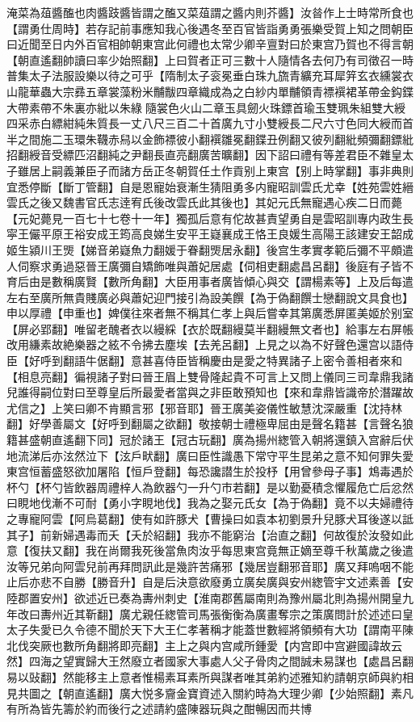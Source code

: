 淹菜為葅醬醢也肉醬跂醬皆謂之醢又菜葅謂之醬内則芥醬】汝㫺作上士時常所食也【謂勇仕周時】若存記前事應知我心後遇冬至百官皆詣勇勇張樂受賀上知之問朝臣曰近聞至日内外百官相帥朝東宫此何禮也太常少卿辛亶對曰於東宫乃賀也不得言朝【朝直遙翻帥讀曰率少始照翻】上曰賀者正可三數十人隨情各去何乃有司徵召一時普集太子法服設樂以待之可乎【隋制太子衮冕垂白珠九旒青纊充耳犀笄玄衣纁裳衣山龍華蟲大宗彞五章裳藻粉米黼黻四章織成為之白紗内單黼領青褾襈裙革帶金鈎鍱大帶素帶不朱裏亦紕以朱綠隨裳色火山二章玉具劒火珠鏢首瑜玉雙珮朱組雙大綬四采赤白縹紺純朱質長一丈八尺三百二十首廣九寸小雙綬長二尺六寸色同大綬而首半之間施二玉環朱韈赤舄以金飾褾彼小翻襈雛冕翻鍱丑例翻又彼列翻紕頻彌翻鏢紕招翻綬音受縹匹沼翻純之尹翻長直亮翻廣苦曠翻】因下詔曰禮有等差君臣不雜皇太子雖居上嗣義兼臣子而諸方岳正冬朝賀任土作貢别上東宫【别上時掌翻】事非典則宜悉停斷【斷丁管翻】自是恩寵始衰漸生猜阻勇多内寵昭訓雲氏尤幸【姓苑雲姓縉雲氏之後又魏書官氏志逹宥氏後改雲氏此其後也】其妃元氏無寵遇心疾二日而薨【元妃薨見一百七十七卷十一年】獨孤后意有佗故甚責望勇自是雲昭訓專内政生長寜王儼平原王裕安成王筠高良娣生安平王嶷襄成王恪王良媛生高陽王該建安王韶成姬生潁川王煚【娣音弟嶷魚力翻媛于眷翻煚居永翻】後宫生孝實孝範后彌不平頗遣人伺察求勇過惡晉王廣彌自矯飾唯與蕭妃居處【伺相吏翻處昌呂翻】後庭有子皆不育后由是數稱廣賢【數所角翻】大臣用事者廣皆傾心與交【謂楊素等】上及后每遣左右至廣所無貴賤廣必與蕭妃迎門接引為設美饌【為于偽翻饌士戀翻說文具食也】申以厚禮【申重也】婢僕往來者無不稱其仁孝上與后嘗幸其第廣悉屏匿美姬於别室【屏必郢翻】唯留老醜者衣以縵綵【衣於既翻縵莫半翻縵無文者也】給事左右屏帳改用縑素故絶樂器之絃不令拂去塵埃【去羌呂翻】上見之以為不好聲色還宫以語侍臣【好呼到翻語牛倨翻】意甚喜侍臣皆稱慶由是愛之特異諸子上密令善相者來和【相息亮翻】徧視諸子對曰晉王眉上雙骨隆起貴不可言上又問上儀同三司韋鼎我諸兒誰得嗣位對曰至尊皇后所最愛者當與之非臣敢預知也【來和韋鼎皆識帝於潛躍故尤信之】上笑曰卿不肯顯言邪【邪音耶】晉王廣美姿儀性敏慧沈深嚴重【沈持林翻】好學善屬文【好呼到翻屬之欲翻】敬接朝士禮極卑屈由是聲名籍甚【言聲名狼籍甚盛朝直遙翻下同】冠於諸王【冠古玩翻】廣為揚州緫管入朝將還鎮入宫辭后伏地流涕后亦泫然泣下【泫戶畎翻】廣曰臣性識愚下常守平生昆弟之意不知何罪失愛東宫恒蓄盛怒欲加屠陷【恒戶登翻】每恐讒譛生於投杼【用曾參母子事】鴆毒遇於杯勺【杯勺皆飲器周禮梓人為飲器勺一升勺市若翻】是以勤憂積念懼履危亡后忿然曰睍地伐漸不可耐【勇小字睍地伐】我為之娶元氏女【為于偽翻】竟不以夫婦禮待之專寵阿雲【阿烏葛翻】使有如許豚犬【曹操曰如袁本初劉景升兒豚犬耳後遂以詆其子】前新婦遇毒而夭【夭於紹翻】我亦不能窮治【治直之翻】何故復於汝發如此意【復扶又翻】我在尚爾我死後當魚肉汝乎每思東宫竟無正嫡至尊千秋萬歲之後遣汝等兄弟向阿雲兒前再拜問訊此是幾許苦痛邪【幾居豈翻邪音耶】廣又拜嗚咽不能止后亦悲不自勝【勝音升】自是后決意欲廢勇立廣矣廣與安州緫管宇文述素善【安陸郡置安州】欲述近已奏為夀州刺史【淮南郡舊屬南則為豫州屬北則為揚州開皇九年改曰夀州近其靳翻】廣尤親任緫管司馬張衡衡為廣畫奪宗之策廣問計於述述曰皇太子失愛已久令德不聞於天下大王仁孝著稱才能蓋世數經將領頻有大功【謂南平陳北伐突厥也數所角翻將即亮翻】主上之與内宫咸所鍾愛【内宫即中宫避國諱故云然】四海之望實歸大王然廢立者國家大事處人父子骨肉之間誠未易謀也【處昌呂翻易以䜴翻】然能移主上意者惟楊素耳素所與謀者唯其弟約述雅知約請朝京師與約相見共圖之【朝直遙翻】廣大悦多齎金寶資述入關約時為大理少卿【少始照翻】素凡有所為皆先籌於約而後行之述請約盛陳器玩與之酣暢因而共博